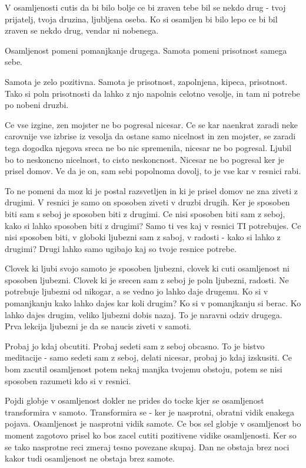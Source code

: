V osamljenosti cutis da bi bilo bolje ce bi zraven tebe bil se nekdo drug - tvoj prijatelj, tvoja druzina, ljubljena oseba. Ko si osamljen bi bilo lepo ce bi bil zraven se nekdo drug, vendar ni nobenega. 

Osamljenost pomeni pomanjkanje drugega. Samota pomeni prisotnost samega sebe. 

Samota je zelo pozitivna. Samota je prisotnost, zapolnjena, kipeca, prisotnost. Tako si poln prisotnosti da lahko z njo napolnis celotno vesolje, in tam ni potrebe po nobeni druzbi. 

Ce vse izgine, zen mojster ne bo pogresal nicesar. Ce se kar naenkrat zaradi neke carovnije vse izbrise iz vesolja da ostane samo nicelnost in zen mojster, se zaradi tega dogodka njegova sreca ne bo nic spremenila, nicesar ne bo pogresal. Ljubil bo to neskoncno nicelnost, to cisto neskoncnost. Nicesar ne bo pogresal ker je prisel domov. Ve da je on, sam sebi popolnoma dovolj, to je vse kar v resnici rabi. 

To ne pomeni da moz ki je postal razsvetljen in ki je prisel domov ne zna ziveti z drugimi. V resnici je samo on sposoben ziveti v druzbi drugih. Ker je sposoben biti sam s seboj je sposoben biti z drugimi. Ce nisi sposoben biti sam z seboj, kako si lahko sposoben biti z drugimi? Samo ti ves kaj v resnici TI potrebujes. Ce nisi sposoben biti, v globoki ljubezni sam z saboj, v radosti - kako si lahko z drugimi? Drugi lahko samo ugibajo kaj so tvoje resnice potrebe. 

Clovek ki ljubi svojo samoto je sposoben ljubezni, clovek ki cuti osamljenost ni sposoben ljubezni. Clovek ki je srecen sam z seboj je poln ljubezni, radosti. Ne potrebuje ljubezni od nikogar, a se vedno jo lahko daje drugemu. Ko si v pomanjkanju kako lahko dajes kar koli drugim? Ko si v pomanjkanju si berac. Ko lahko dajes drugim, veliko ljubezni dobis nazaj. To je naravni odziv drugega. Prva lekcija ljubezni je da se naucis ziveti v samoti. 

Probaj jo kdaj obcutiti. Probaj sedeti sam z seboj obcasno. To je bistvo meditacije - samo sedeti sam z seboj, delati nicesar, probaj jo kdaj izskusiti. Ce bom zacutil osamljenost potem nekaj manjka tvojemu obstoju, potem se nisi sposoben razumeti kdo si v resnici. 

Pojdi globje v osamljenost dokler ne prides do tocke kjer se osamljenost transformira v samoto. Transformira se - ker je nasprotni, obratni vidik enakega pojava. Osamljenost je nasprotni vidik samote. Ce bos sel globje v osamljenost bo moment zagotovo prisel ko bos zacel cutiti pozitivene vidike osamljenosti. Ker so se tako nasprotne reci zmeraj tesno povezane skupaj. Dan ne obstaja brez noci kakor tudi osamljenost ne obstaja brez samote. 


